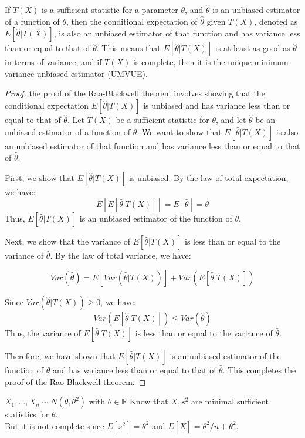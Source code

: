 \documentclass[answers,12pt,addpoints]{exam}
\begin{document}
\begin{theorem}
     If $T(X)$ is a sufficient statistic for a parameter $\theta$, and $\hat{\theta}$ is an unbiased estimator of a function of $\theta$, then the conditional expectation of $\hat{\theta}$ given $T(X)$, denoted as $E[\hat{\theta} | T(X)]$, is also an unbiased estimator of that function and has variance less than or equal to that of $\hat{\theta}$. This means that $E[\hat{\theta} | T(X)]$ is at least as good as $\hat{\theta}$ in terms of variance, and if $T(X)$ is complete, then it is the unique minimum variance unbiased estimator (UMVUE).
    \begin{proof}
        the proof of the Rao-Blackwell theorem involves showing that the conditional expectation $E[\hat{\theta} | T(X)]$ is unbiased and has variance less than or equal to that of $\hat{\theta}$.
        Let $T(X)$ be a sufficient statistic for $\theta$, and let $\hat{\theta}$ be an unbiased estimator of a function of $\theta$. We want to show that $E[\hat{\theta} | T(X)]$ is also an unbiased estimator of that function and has variance less than or equal to that of $\hat{\theta}$.

        First, we show that $E[\hat{\theta} | T(X)]$ is unbiased. By the law of total expectation, we have:
        \[
E[E[\hat{\theta} | T(X)]] = E[\hat{\theta}] = \theta\]
        Thus, $E[\hat{\theta} | T(X)]$ is an unbiased estimator of the function of $\theta$.

        Next, we show that the variance of $E[\hat{\theta} | T(X)]$ is less than or equal to the variance of $\hat{\theta}$. By the law of total variance, we have:

        \[
Var(\hat{\theta}) = E[Var(\hat{\theta} | T(X))] + Var(E[\hat{\theta} | T(X)])\]

        Since $Var(\hat{\theta} | T(X)) \geq 0$, we have:
        \[
Var(E[\hat{\theta} | T(X)]) \leq Var(\hat{\theta})\]
        Thus, the variance of $E[\hat{\theta} | T(X)]$ is less than or equal to the variance of $\hat{\theta}$.

        Therefore, we have shown that $E[\hat{\theta} | T(X)]$ is an unbiased estimator of the function of $\theta$ and has variance less than or equal to that of $\hat{\theta}$. This completes the proof of the Rao-Blackwell theorem.

    \end{proof}
\end{theorem}

\begin{example}
    $X_1, \ldots, X_n \sim N(\theta, \theta^2)$ with $\theta \in \mathbb{R}$ Know that $\bar{X}, s^2$ are minimal sufficient statistics for $\theta$.\\
    But it is not complete since $E[s^2] = \theta^2$ and $E[\bar{X}] = \theta^2 / n + \theta^2$.
\end{example}
\end{document}
